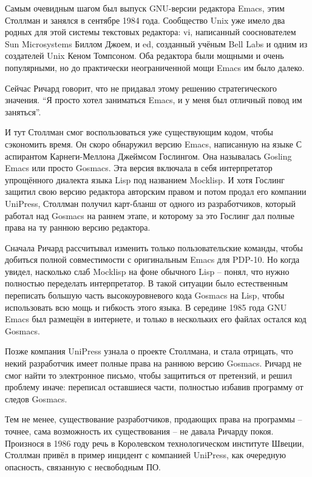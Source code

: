 Самым очевидным шагом был выпуск GNU-версии редактора Emacs, этим Столлман и занялся в сентябре 1984 года. Сообщество Unix уже имело два родных для этой системы текстовых редактора: vi, написанный сооснователем Sun Microsystems Биллом Джоем, и ed, созданный учёным Bell Labs и одним из создателей Unix Кеном Томпсоном. Оба редактора были мощными и очень популярными, но до практически неограниченной мощи Emacs им было далеко.

Сейчас Ричард говорит, что не придавал этому решению стратегического значения. \enquote{Я просто хотел заниматься Emacs, и у меня был отличный повод им заняться}.

И тут Столлман смог воспользоваться уже существующим кодом, чтобы сэкономить время. Он скоро обнаружил версию Emacs, написанную на языке С аспирантом Карнеги-Меллона Джеймсом Гослингом. Она называлась Gosling Emacs или просто Gosmacs. Эта версия включала в себя интерпретатор упрощённого диалекта языка Lisp под названием Mocklisp. И хотя Гослинг защитил свою версию редактора авторским правом и потом продал его компании UniPress, Столлман получил карт-бланш от одного из разработчиков, который работал над Gosmacs на раннем этапе, и которому за это Гослинг дал полные права на ту раннюю версию редактора.

Сначала Ричард рассчитывал изменить только пользовательские команды, чтобы добиться полной совместимости с оригинальным Emacs для PDP-10. Но когда увидел, насколько слаб Mocklisp на фоне обычного Lisp -- понял, что нужно полностью переделать интерпретатор. В такой ситуации было естественным переписать большую часть высокоуровневого кода Gosmacs на Lisp, чтобы использовать всю мощь и гибкость этого языка. В середине 1985 года GNU Emacs был размещён в интернете, и только в нескольких его файлах остался код Gosmacs.

Позже компания UniPress узнала о проекте Столлмана, и стала отрицать, что некий разработчик имеет полные права на раннюю версию Gosmacs. Ричард не смог найти то электронное письмо, чтобы защититься от претензий, и решил проблему иначе: переписал оставшиеся части, полностью избавив программу от следов Gosmacs.

Тем не менее, существование разработчиков, продающих права на программы -- точнее, сама возможность их существования -- не давала Ричарду покоя. Произнося в 1986 году речь в Королевском технологическом институте Швеции, Столлман привёл в пример инцидент с компанией UniPress, как очередную опасность, связанную с несвободным ПО.

